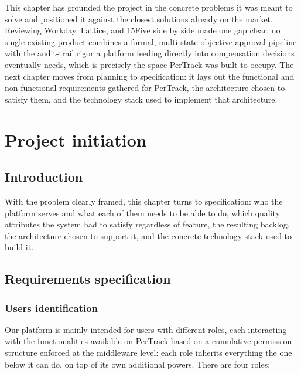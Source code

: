 \documentclass[12pt,a4paper]{report}
\begin{document}
This chapter has grounded the project in the concrete problems it was meant to solve and positioned it against the closest solutions already on the market. Reviewing Workday, Lattice, and 15Five side by side made one gap clear: no single existing product combines a formal, multi-state objective approval pipeline with the audit-trail rigor a platform feeding directly into compensation decisions eventually needs, which is precisely the space PerTrack was built to occupy. The next chapter moves from planning to specification: it lays out the functional and non-functional requirements gathered for PerTrack, the architecture chosen to satisfy them, and the technology stack used to implement that architecture.

\chapter{Project initiation}
\label{ch:initiation}

\section{Introduction}

With the problem clearly framed, this chapter turns to specification: who the platform serves and what each of them needs to be able to do, which quality attributes the system had to satisfy regardless of feature, the resulting backlog, the architecture chosen to support it, and the concrete technology stack used to build it.

\section{Requirements specification}

\subsection{Users identification}

Our platform is mainly intended for users with different roles, each interacting with the functionalities available on PerTrack based on a cumulative permission structure enforced at the middleware level: each role inherits everything the one below it can do, on top of its own additional powers. There are four roles:
\end{document}
